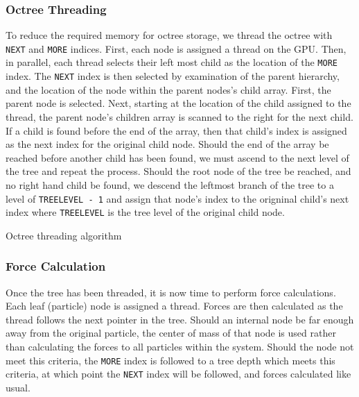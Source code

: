 \documentclass{thesis}
\begin{document}
\subsubsection{Octree Threading}
To reduce the required memory for octree storage, we thread the octree with \verb|NEXT| and \verb|MORE| indices. First, each node is assigned a thread on the GPU. Then, in parallel, each thread selects their left most child as the location of the \verb|MORE| index. The \verb|NEXT| index is then selected by examination of the parent hierarchy, and the location of the node within the parent nodes's child array. First, the parent node is selected. Next, starting at the location of the child assigned to the thread, the parent node's children array is scanned to the right for the next child. If a child is found before the end of the array, then that child's index is assigned as the next index for the original child node. Should the end of the array be reached before another child has been found, we must ascend to the next level of the tree and repeat the process. Should the root node of the tree be reached, and no right hand child be found, we descend the leftmost branch of the tree to a level of \verb|TREELEVEL - 1| and assign that node's index to the origninal child's next index where \verb|TREELEVEL| is the tree level of the original child node.
\begin{algorithm}
    \label{alg:OctreeThreading}
    \caption{Octree threading algorithm}
    \begin{algorithmic}
        \EndFor
    \end{algorithmic}
\end{algorithm}
\subsubsection{Force Calculation}
Once the tree has been threaded, it is now time to perform force calculations. Each leaf (particle) node is assigned a thread. Forces are then calculated as the thread follows the next pointer in the tree. Should an internal node be far enough away from the original particle, the center of mass of that node is used rather than calculating the forces to all particles within the system. Should the node not meet this criteria, the \verb|MORE| index is followed to a tree depth which meets this criteria, at which point the \verb|NEXT| index will be followed, and forces calculated like usual.
\end{document}

